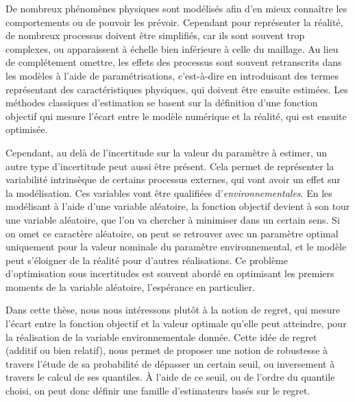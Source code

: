 \documentclass[12pt, a4paper]{article}
\begin{document}
De nombreux phénomènes physiques sont modélisés afin d'en mieux
connaître les comportements ou de pouvoir les prévoir. Cependant pour
représenter la réalité, de nombreux processus doivent être simplifiés,
car ils sont souvent trop complexes, ou apparaissent à échelle bien
inférieure à celle du maillage. Au lieu de complétement omettre, les
effets des processus sont souvent retranscrits dans les modèles à
l'aide de paramétrisations, c'est-à-dire en introduisant des termes
représentant des caractéristiques physiques, qui doivent être ensuite
estimées. Les méthodes classiques d'estimation se basent sur la
définition d'une fonction objectif qui mesure l'écart entre le modèle
numérique et la réalité, qui est ensuite optimisée. %

Cependant, au delà de l'incertitude sur la valeur du paramètre à
estimer, un autre type d'incertitude peut aussi être présent. Cela
permet de représenter la variabilité intrinsèque de certains processus
externes, qui vont avoir un effet sur la modélisation. Ces variables
vont être qualifiées d'\emph{environnementales}. En les %
modélisant à l'aide d'une variable aléatoire, la fonction objectif
devient à son tour une variable aléatoire, que l'on va chercher à
minimiser dans un certain sens. Si on omet ce caractère aléatoire, on
peut se retrouver avec un paramètre optimal uniquement pour la valeur
nominale du paramètre environnemental, et le modèle peut s'éloigner de
la réalité pour d'autres réalisations. Ce problème d'optimisation sous
incertitudes est souvent abordé en optimisant les premiers moments de
la variable aléatoire, l'espérance en particulier.

Dans cette thèse, nous nous intéressons plutôt à la notion de regret,
qui mesure l'écart entre la fonction objectif et la valeur optimale
qu'elle peut atteindre, pour la réalisation de la variable
environnementale donnée. Cette idée de regret (additif ou bien
relatif), nous permet de proposer une notion de robustesse à travers
l'étude de sa probabilité de dépasser un certain seuil, ou inversement
à travers le calcul de ses quantiles. À l'aide de ce seuil, ou de
l'ordre du quantile choisi, on peut donc définir une famille
d'estimateurs basés sur le regret.
\end{document}
